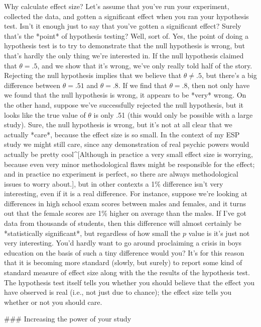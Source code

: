 Why calculate effect size? Let's assume that you've run your experiment, collected the data, and gotten a significant effect when you ran your hypothesis test. Isn't it enough just to say that you've gotten a significant effect? Surely that's the *point* of hypothesis testing? Well, sort of. Yes, the point of doing a hypothesis test is to try to demonstrate that the null hypothesis is wrong, but that's hardly the only thing we're interested in. If the null hypothesis claimed that $\theta = .5$, and we show that it's wrong, we've only really told half of the story. Rejecting the null hypothesis implies that we believe that $\theta \neq .5$, but there's a big difference between $\theta = .51$ and $\theta = .8$. If we find that $\theta = .8$, then not only have we found that the null hypothesis is wrong, it appears to be *very* wrong. On the other hand, suppose we've successfully rejected the null hypothesis, but it looks like the true value of $\theta$ is only .51 (this would only be possible with a large study). Sure, the null hypothesis is wrong, but it's not at all clear that we actually *care*, because the effect size is so small. In the context of my ESP study we might still care, since any demonstration of real psychic powers would actually be pretty cool^[Although in practice a very small effect size is worrying, because even very minor methodological flaws might be responsible for the effect; and in practice no experiment is perfect, so there are always methodological issues to worry about.], but in other contexts a 1\% difference isn't very interesting, even if it is a real difference. For instance, suppose we're looking at differences in high school exam scores between males and females, and it turns out that the female scores are 1\% higher on average than the males. If I've got data from thousands of students, then this difference will almost certainly be *statistically significant*, but regardless of how small the $p$ value is it's just not very interesting. You'd hardly want to go around proclaiming a crisis in boys education on the basis of such a tiny difference would you? It's for this reason that it is becoming more standard (slowly, but surely) to report some kind of standard measure of effect size along with the the results of the hypothesis test. The hypothesis test itself tells you whether you should believe that the effect you have observed is real (i.e., not just due to chance); the effect size tells you whether or not you should care.



### Increasing the power of your study

